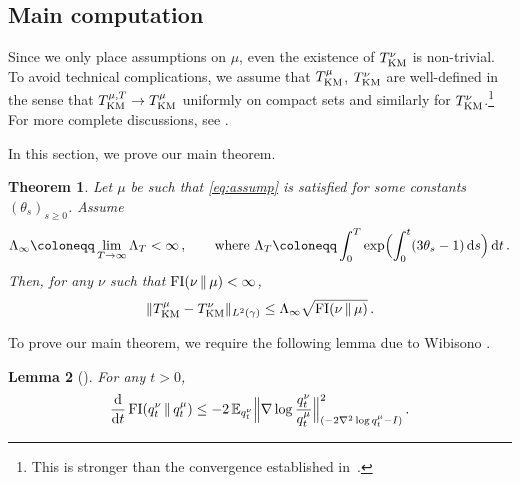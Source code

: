 \documentclass[12pt]{article}
\newcommand{\E}{\mathbb{E}}
\newcommand{\1}{\mathds{1}}
\newcommand*{\defeq}{\coloneqq}
\newcommand*{\rd}{\mathrm{d}}
\newcommand*{\dd}{\, \rd}
\newcommand{\mmid}{\,\Vert\,}
\def\defeq{\coloneqq} %
\theoremstyle{plain}
\newtheorem{theorem}{Theorem}[section]
\newtheorem{lemma}[theorem]{Lemma}
\theoremstyle{definition}
\theoremstyle{remark}
\begin{document}
\subsection{Main computation}\label{sec:main_computation}
{Since we only place assumptions on $\mu$, even the existence of $T_{\rm KM}^\nu$ is non-trivial. To avoid technical complications, we assume that $T_{\rm KM}^\mu$, $T_{\rm KM}^\nu$ are well-defined in the sense that $T_{\rm KM}^{\mu,T} \to T_{\rm KM}^\mu$ uniformly on compact sets and similarly for $T_{\rm KM}^\nu$.\footnote{{This is stronger than the convergence established in~\cite{MikShe23HeatFlow}.}}} {For more complete discussions, see \cite{kim2012generalization,MikShe23HeatFlow}.}

In this section, we prove our main theorem.

\begin{theorem}\label{thm:l2_result}
Let $\mu$ be such that \eqref{eq:assump} is satisfied for some constants $(\theta_s)_{s \geq 0}$.
{Assume
\begin{align*}
    \Lambda_\infty \defeq \lim_{T\to\infty} \Lambda_T < \infty\,, \qquad\text{where}~\Lambda_T \defeq \int_0^T \exp\Bigl(\int_0^t (3\theta_s-1)\dd s\Bigr)\dd t\,.
\end{align*}
}
Then, for any $\nu$ such that $\rm{FI}(\nu\mmid\mu) < \infty$,
\begin{align}\label{eq:main_result_equation}
    \|T_{\rm KM}^\mu - T_{\rm KM}^\nu\|_{L^2(\gamma)} \leq \Lambda_\infty \sqrt{{\rm FI}(\nu\mmid \mu)}\,.
\end{align}
\end{theorem}
To prove our main theorem, we require the following lemma due to Wibisono \cite{wibisono2025mixing}.
\begin{lemma}[{\citep[Theorem 4(i)]{wibisono2025mixing}}]\label{lem:andre}
For any $t > 0$,
\begin{align*}
    \frac{{\rm d}}{{\rm d}t}\, {\rm FI}(q_{t}^\nu\mmid q_t^\mu)\leq -2\, \E_{q_t^\nu}\Bigl\|\nabla \log \frac{q^\nu_{t}}{q_t^\mu}\Bigr\|^2_{(-2\nabla^2 \log q_t^\mu {-} I)}\,.
\end{align*}
\end{lemma}
\end{document}
